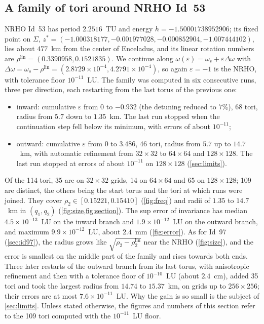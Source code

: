 \documentclass[11pt]{article}
\begin{document}
\subsection{A family of tori around NRHO Id~53}\label{sec:id53}
NRHO Id~53 has period $2.2516$~TU and energy $h = -1.50001738952906$; its fixed point on $\Sigma$,
$z^* = (-1.000318177, -0.001977028, -0.000852904, -1.007444102)$, lies about $477$~km from the
center of Enceladus, and its linear rotation numbers are
$\rho^{\mathrm{lin}} = (0.3390958, 0.1521835)$. We continue along
$\omega(\varepsilon) = \omega_s + \varepsilon\Delta\omega$ with
$\Delta\omega = \omega_s - \rho^{\mathrm{lin}} = (2.8729\times10^{-4}, 4.2791\times10^{-4})$, so
again $\varepsilon=-1$ is the NRHO, with tolerance floor $10^{-11}$~LU. The family was computed in
six consecutive runs, three per direction, each restarting from the last torus of the previous one:
\begin{itemize}
\item inward: cumulative $\varepsilon$ from $0$ to $-0.932$ (the detuning reduced to $7\%$),
  68 tori, radius from $5.7$ down to $1.35$~km. The last run stopped when the continuation step fell
  below its minimum, with errors of about $10^{-11}$;
\item outward: cumulative $\varepsilon$ from $0$ to $3.486$, 46 tori, radius from $5.7$ up to
  $14.7$~km, with automatic refinement from $32\times32$ to $64\times64$ and $128\times128$. The last
  run stopped at errors of about $10^{-11}$ on $128\times128$ (\cref{sec:limits}).
\end{itemize}
Of the 114 tori, 35 are on $32\times32$ grids, 14 on $64\times64$ and 65 on $128\times128$; 109 are
distinct, the others being the start torus and the tori at which runs were joined. They cover
$\rho_2\in[0.15221, 0.15410]$ (\cref{fig:freq}) and radii of $1.35$ to $14.7$~km in $(q_1,q_2)$
(\cref{fig:size,fig:section}). The sup error of invariance has median $4.5\times10^{-13}$~LU on the
inward branch and $1.9\times10^{-12}$~LU on the outward branch, and maximum $9.9\times10^{-12}$~LU,
about $2.4$~mm (\cref{fig:error}). As for Id~97 (\cref{sec:id97}), the radius grows like
$\sqrt{\rho_2-\rho^{\mathrm{lin}}_2}$ near the NRHO (\cref{fig:size}), and the error is smallest on
the middle part of the family and rises towards both ends. Three later restarts of the outward
branch from its last torus, with anisotropic refinement and then with a tolerance floor of
$10^{-10}$~LU (about $2.4$~cm), added 35 tori and took the largest radius from $14.74$ to
$15.37$~km, on grids up to $256\times256$; their errors are at most $7.6\times10^{-11}$~LU. Why the
gain is so small is the subject of \cref{sec:limits}. Unless stated otherwise, the figures and
numbers of this section refer to the 109 tori computed with the $10^{-11}$~LU floor.
\end{document}
